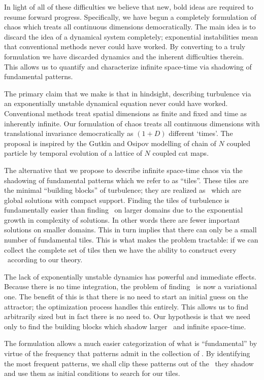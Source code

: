 In light of all of these difficulties we believe that new, bold ideas are
required to resume forward progress. Specifically, we have begun a completely
{\spt} formulation of chaos which treats all continuous dimensions democratically.
The main idea is to discard the idea of a dynamical system completely; exponential
instabilities mean that conventional methods never could have worked. By converting to
a truly {\spt} formulation we have discarded dynamics and the inherent difficulties therein.
This allows us to quantify and characterize infinite space-time via shadowing
of fundamental {\spt} patterns.

The primary claim that we make is that in hindsight, describing turbulence
via an exponentially unstable dynamical equation never could have worked.
Conventional methods treat spatial dimensions
as finite and fixed and time as inherently infinite.
Our {\spt} formulation of chaos treats all continuous dimensions with translational
invariance democratically as $(1+D)$ different `times'.
The proposal is inspired by the Gutkin and Osipov
modelling of chain of $N$ coupled particle by temporal evolution of a
lattice of $N$ coupled cat maps.

The alternative that we propose to describe infinite space-time chaos via
the shadowing of fundamental patterns which we refer to as ``tiles''.
These tiles are the minimal ``building blocks'' of turbulence; they are realized
as \twots\ which are global solutions with compact support.
Finding the tiles of turbulence is fundamentally easier than finding
\twots\ on larger domains due to the exponential growth in complexity of
solutions. In other words there are fewer important solutions on smaller
domains. This in turn implies that there can only be a small
number of fundamental tiles. This is what makes the problem tractable:
if we can collect the complete set of tiles then we have the ability to
construct every \twot\ according to our theory.

The lack of exponentially unstable dynamics has powerful and immediate effects.
Because there is no time integration, the problem of finding \twots\ is
now a variational one. The benefit of this is that there is no need to start
an initial guess on the attractor; the optimization process handles this
entirely. This allows us to find arbitrarily sized \twots but in fact
there is no need to. Our hypothesis is that we need only to find the
building blocks which shadow larger \twots\ and infinite space-time.

The {\spt} formulation allows a much easier categorization of what is
``fundamental'' by virtue of the frequency that patterns admit in the
collection of \twots. By identifying the most frequent patterns, we shall
clip these patterns out of the \twots\ they shadow and use them as initial
conditions to search for our tiles.

